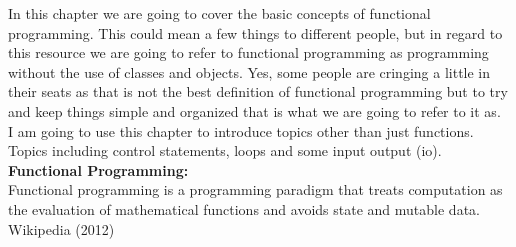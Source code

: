 In this chapter we are going to cover the basic concepts of functional programming. This could mean a few things
to different people, but in regard to this resource we are going to refer to functional programming as programming
without the use of classes and objects. Yes, some people are cringing a little in their seats as that is not the best
definition of functional programming but to try and keep things simple and organized that is what we are going to
refer to it as.
\newline
\\
I am going to use this chapter to introduce topics other than just functions. Topics including control statements, loops and some input output (io).
\newline
\\
{\bf Functional Programming:}
\\
Functional programming is a programming paradigm that treats computation as the evaluation of mathematical functions and avoids state and mutable data.
\newline
Wikipedia (2012)
